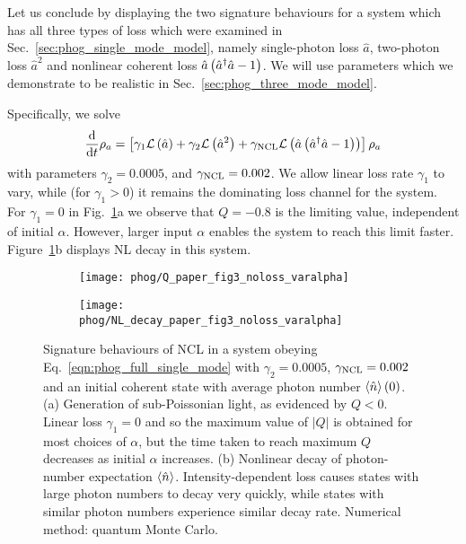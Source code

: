 Let us conclude by displaying the two signature behaviours for a system which has all three types of loss which were examined in Sec.~\ref{sec:phog_single_mode_model}, namely single-photon loss $\hat{a}$, two-photon loss $\hat{a}^2$ and nonlinear coherent loss $\hat{a}\left(\hat{a}^\dagger \hat{a} - 1\right)$. We will use parameters which we demonstrate to be realistic in Sec.~\ref{sec:phog_three_mode_model}.

Specifically, we solve
\begin{equation}\label{eqn:phog_full_single_mode}
\frac{\mathrm{d}}{\mathrm{d}t} \rho_a = \left[\gamma_1 \mathcal{L}\left(\hat{a}\right) + \gamma_2 \mathcal{L}\left(\hat{a}^2\right) + \gamma_{\text{NCL}} \mathcal{L}\left(\hat{a}\left(\hat{a}^\dagger \hat{a} - 1\right)\right) \right] \rho_a
\end{equation}
with parameters $\gamma_2 = 0.0005$, and $\gamma_{\text{NCL}} = 0.002$. We allow linear loss rate $\gamma_1$ to vary, while (for $\gamma_1 >0$) it remains the dominating loss channel for the system. For $\gamma_1=0$ in Fig.~\ref{fig:phog_fig3paper}a we observe that $Q = -0.8$ is the limiting value, independent of initial $\alpha$. However, larger input $\alpha$ enables the system to reach this limit faster. Figure~\ref{fig:phog_fig3paper}b displays NL decay in this system.

\begin{figure}[htp]
\captionsetup{width=0.8\linewidth}
\centering
	\begin{subfigure}{0.7\linewidth}
	\centering
	\caption{}
	\texttt{[image: phog/Q\_paper\_fig3\_noloss\_varalpha]}
	\end{subfigure}
	\begin{subfigure}{0.7\linewidth}
	\centering
	\caption{}
	\texttt{[image: phog/NL\_decay\_paper\_fig3\_noloss\_varalpha]}
	\end{subfigure}
\caption{\label{fig:phog_fig3paper} Signature behaviours of NCL in a system obeying Eq.~\ref{eqn:phog_full_single_mode} with $\gamma_2 = 0.0005$, $\gamma_{\text{NCL}} = 0.002$ and an initial coherent state with average photon number $\ev{\hat{n}}\left(0\right)$. (a) Generation of sub-Poissonian light, as evidenced by $Q<0$. Linear loss $\gamma_1=0$ and so the maximum value of $\left|Q\right|$ is obtained for most choices of $\alpha$, but the time taken to reach maximum $Q$ decreases as initial $\alpha$ increases. (b) Nonlinear decay of photon-number expectation $\ev{\hat{n}}$. Intensity-dependent loss causes states with large photon numbers to decay very quickly, while states with similar photon numbers experience similar decay rate. Numerical method: quantum Monte Carlo.}
\end{figure}

